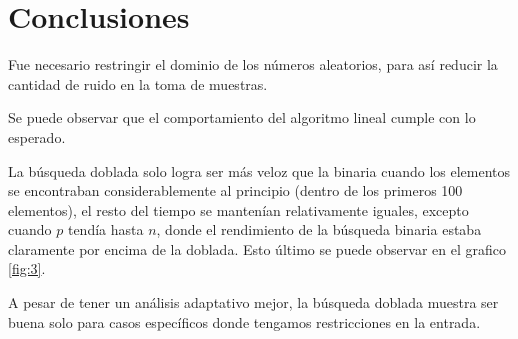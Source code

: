 \documentclass[]{article}
\begin{document}
\section{Conclusiones}

Fue necesario restringir el dominio de los números aleatorios, para así reducir la cantidad de ruido en la toma de muestras.

Se puede observar que el comportamiento del algoritmo lineal cumple con lo esperado.

La búsqueda doblada solo logra ser más veloz que la binaria cuando los elementos se encontraban considerablemente al principio (dentro de los primeros 100 elementos), el resto del tiempo se mantenían relativamente iguales, excepto cuando $p$ tendía hasta $n$, donde el rendimiento de la búsqueda binaria estaba claramente por encima de la doblada. Esto último se puede observar en el grafico \ref{fig:3}.

A pesar de tener un análisis adaptativo mejor, la búsqueda doblada muestra ser buena solo para casos específicos donde tengamos restricciones en la entrada.
\end{document}

